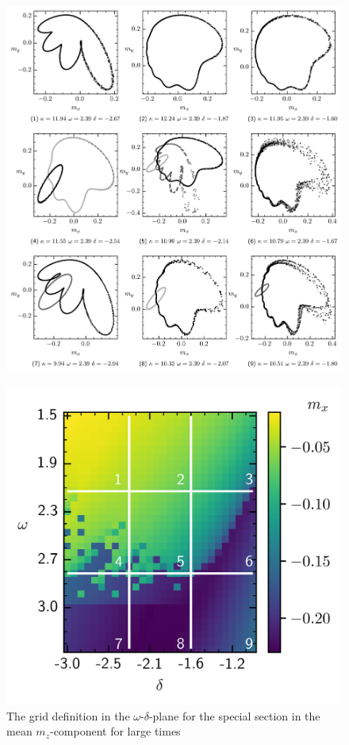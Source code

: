 \documentclass{article}
\begin{document}
\begin{figure}[H]
    \vspace{-0.35cm}
    \hspace*{-1.3cm}
    \includegraphics{pictures/lc_traj_wcut.png}
\end{figure}
\begin{figure}
    \includegraphics{pictures/k_cut_spec_sec.png}
    \caption{The grid definition in the $\omega$-$\delta$-plane for the special section in the mean $m_z$-component for large times}
\end{figure}
\end{document}
